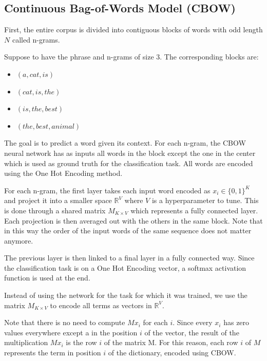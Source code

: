 \subsection{Continuous Bag-of-Words Model (CBOW)}
First, the entire corpus is divided into contiguous blocks of words with odd length $N$ called n-grams.

Suppose to have the phrase  and n-grams of size $3$.
The corresponding blocks are:
\begin{multicols}{2}
    \begin{itemize}
        \item $(a, cat, is)$
        \item $(cat, is, the)$
        \item $(is, the, best)$
        \item $(the, best, animal)$
    \end{itemize}
\end{multicols}

The goal is to predict a word given its context.
For each n-gram, the CBOW neural network has as inputs all words in the block
except the one in the center which is used as ground truth for the classification task.
All words are encoded using the One Hot Encoding method.

For each n-gram, the first layer takes each input word encoded as $x_i \in \{0, 1\}^K$ and project it into a smaller space $\mathbb{R}^V$
where $V$ is a hyperparameter to tune.
This is done through a shared matrix $M_{K \times V}$ which represents a fully connected layer.
Each projection is then averaged out with the others in the same block.
Note that in this way the order of the input words of the same sequence does not matter anymore.

The previous layer is then linked to a final layer in a fully connected way.
Since the classification task is on a One Hot Encoding vector,
a softmax activation function is used at the end.

Instead of using the network for the task for which it was trained, we use the matrix $M_{K \times V}$ to encode all terms as vectors in $\mathbb{R}^V$.

Note that there is no need to compute $M x_i$ for each $i$.
Since every $x_i$ has zero values everywhere except a  in the position $i$ of the vector, the result of the multiplication $M x_i$ is the row $i$ of the matrix M.
For this reason, each row $i$ of $M$ represents the term in position $i$ of the dictionary, encoded using CBOW.

